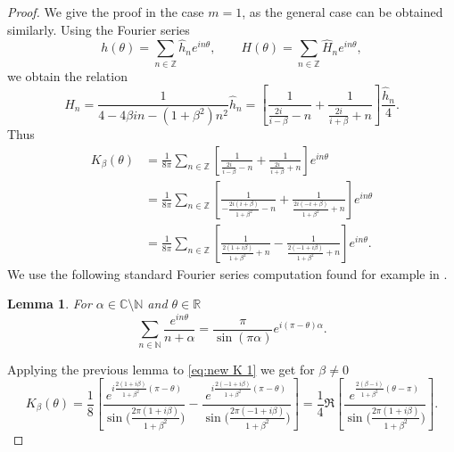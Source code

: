 \documentclass[JEP,XML,SOM,Unicode,NoFloatCountersInSection,published]{cedram}
\theoremstyle{plain}
\newtheorem{lemma}[theorem]{Lemma}
\theoremstyle{definition}
\let\bt\beta
\let\tht\theta
\newcommand{\bbZ}{\mathbb Z}
\begin{document}
\begin{proof}
We give the proof in the case $m = 1$, as the general case can be obtained similarly.
Using the Fourier series
\begin{equation*}
h(\tht) = \sum_{n\in\bbZ} \hat{h}_n e^{in\tht},\qquad H(\tht) = \sum_{n\in\bbZ} \hat{H}_n e^{in\tht},
\end{equation*}
we obtain the relation
\begin{equation}\label{eq:elliptic-Fourier}
\hat{H}_n = \frac{1}{4-4\bt in - (1+\beta^2)n^2} \hat{h}_n= \left[ \frac{1}{ \frac{2i}{i-\beta}- n } + \frac{1}{\frac{2i}{i+\beta} + n} \right] \frac{\hat{h}_n}{4}.
\end{equation}
Thus
\begin{equation}\label{eq:new K 1}
\begin{aligned}
K_{\beta}(\theta)&=\frac{1}{8\pi} \sum_{n\in\bbZ} \left[ \frac{1}{ \frac{2i}{i-\beta}- n } + \frac{1}{\frac{2i}{i+\beta} + n} \right] e^{in\tht }\\
&=\frac{1}{8\pi} \sum_{n\in\bbZ} \left[ \frac{1}{- \frac{2i(i+\beta)}{1+\beta^2}- n } + \frac{1}{\frac{2i(-i+\beta)}{1+\beta^2} + n} \right] e^{in\tht }\\
&=\frac{1}{8\pi} \sum_{n\in\bbZ} \left[\frac{1}{\frac{2(1+i\beta)}{1+\beta^2} + n} - \frac{1}{ \frac{2(-1+i\beta)}{1+\beta^2}+ n } \right] e^{in\tht }.
\end{aligned}
\end{equation}
We use the following standard Fourier series computation found for example in \cite{stein2003princeton}.
\begin{lemma}\label{lem:FS}
For $\alpha \in \mathbb{C}\setminus \mathbb{N}$ and $\theta \in \mathbb{R}$
\[
\sum_{n\in \mathbb{N}}\frac{e^{in\theta}}{n+\alpha}=\frac{\pi}{\sin(\pi\alpha)}e^{i(\pi-\theta)\alpha}.
\]
\end{lemma}
Applying the previous lemma to \eqref{eq:new K 1} we get for $\beta\neq 0$
\begin{equation}\label{eq:cln K}
K_{\beta}(\theta)=\frac{1}{8}\left[\frac{e^{i\frac{2(1+i\beta)}{1+\beta^2}(\pi-\theta)}}{\sin\bigl(\frac{2\pi(1+i\beta)}{1+\beta^2}\bigr)}-\frac{e^{i\frac{2(-1+i\beta)}{1+\beta^2}(\pi-\theta)}}{\sin\bigl(\frac{2\pi(-1+i\beta)}{1+\beta^2}\bigr)}\right]=\frac{1}{4}\Re \left[\frac{e^{\frac{2(\beta-i)}{1+\beta^2}(\theta-\pi)}}{\sin\bigl(\frac{2\pi(1+i\beta)}{1+\beta^2}\bigr)}\right].
\end{equation}


\end{proof}
\end{document}
